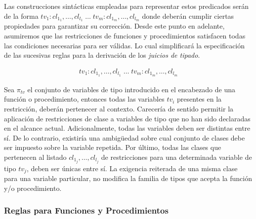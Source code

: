 Las construcciones sintácticas empleadas para representar estos predicados serán de la forma $tv_{1} : cl_{1_1}, \ldots, cl_{l_1} \; \ldots \; tv_{m} : cl_{1_m}, \ldots, cl_{l_m}$ donde deberán cumplir ciertas propiedades para garantizar su corrección.
Desde este punto en adelante, asumiremos que las restricciones de funciones y procedimientos satisfacen todas las condiciones necesarias para ser válidas.
Lo cual simplificará la especificación de las sucesivas reglas para la derivación de los \textit{juicios de tipado}.

\begin{gather*}
tv_{1} : cl_{1_1}, \ldots, cl_{l_1} \; \ldots \; tv_{m} : cl_{1_m}, \ldots, cl_{l_m}
\end{gather*}

Sea $\pi_{tv}$ el conjunto de variables de tipo introducido en el encabezado de una función o procedimiento, entonces todas las variables $tv_{i}$ presentes en la restricción, deberán pertenecer al contexto.
Carecería de sentido permitir la aplicación de restricciones de clase a variables de tipo que no han sido declaradas en el alcance actual.
Adicionalmente, todas las variables deben ser distintas entre sí.
De lo contrario, existiría una ambigüedad sobre cual conjunto de clases debe ser impuesto sobre la variable repetida.
Por último, todas las clases que pertenecen al listado $cl_{1_j}, \ldots, cl_{l_j}$ de restricciones para una determinada variable de tipo $tv_{j}$, deben ser únicas entre sí.
La exigencia reiterada de una misma clase para una variable particular, no modifica la familia de tipos que acepta la función y/o procedimiento.
\fi

\subsubsection{Reglas para Funciones y Procedimientos}


